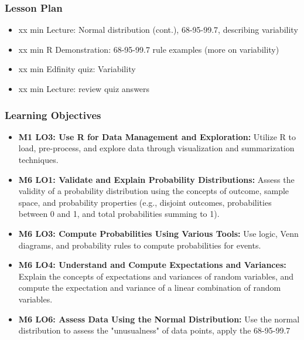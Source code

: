 \begin{frame}
    \frametitle{Lesson Plan}
    \begin{itemize}
        \item xx min Lecture: Normal distribution (cont.), 68-95-99.7, describing variability
        \item xx min R Demonstration: 68-95-99.7 rule examples (more on variability)
        \item xx min Edfinity quiz: Variability
        \item xx min Lecture: review quiz answers
    \end{itemize}
\end{frame}

\begin{frame}
    \frametitle{Learning Objectives}
    \begin{itemize}
        \item \textbf{M1 LO3: Use R for Data Management and Exploration:} Utilize R to load, pre-process, and explore data through visualization and summarization techniques.
        \item \textbf{M6 LO1: Validate and Explain Probability Distributions:} Assess the validity of a probability distribution using the concepts of outcome, sample space, and probability properties (e.g., disjoint outcomes, probabilities between 0 and 1, and total probabilities summing to 1).
        \item \textbf{M6 LO3: Compute Probabilities Using Various Tools:} Use logic, Venn diagrams, and probability rules to compute probabilities for events.
        \item \textbf{M6 LO4: Understand and Compute Expectations and Variances:} Explain the concepts of expectations and variances of random variables, and compute the expectation and variance of a linear combination of random variables.
        \item \textbf{M6 LO6: Assess Data Using the Normal Distribution:} Use the normal distribution to assess the "unusualness" of data points, apply the 68-95-99.7%
    \end{itemize}
\end{frame}
